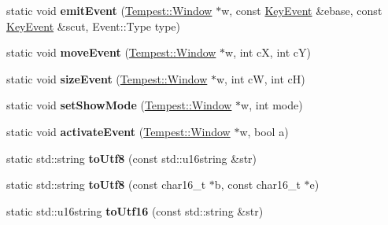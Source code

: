 \begin{DoxyCompactItemize}
\item 
\hypertarget{class_tempest_1_1_system_a_p_i_ae9f04d99e5fc7b2a70711ad51328b2d9}{static void {\bfseries emit\+Event} (\hyperlink{class_tempest_1_1_window}{Tempest\+::\+Window} $\ast$w, const \hyperlink{class_tempest_1_1_key_event}{Key\+Event} \&ebase, const \hyperlink{class_tempest_1_1_key_event}{Key\+Event} \&scut, Event\+::\+Type type)}\label{class_tempest_1_1_system_a_p_i_ae9f04d99e5fc7b2a70711ad51328b2d9}

\item 
\hypertarget{class_tempest_1_1_system_a_p_i_a32ef06cec2b7127355e8578afb216811}{static void {\bfseries move\+Event} (\hyperlink{class_tempest_1_1_window}{Tempest\+::\+Window} $\ast$w, int c\+X, int c\+Y)}\label{class_tempest_1_1_system_a_p_i_a32ef06cec2b7127355e8578afb216811}

\item 
\hypertarget{class_tempest_1_1_system_a_p_i_a6249f4902ba1c2e9e44467cd71828cca}{static void {\bfseries size\+Event} (\hyperlink{class_tempest_1_1_window}{Tempest\+::\+Window} $\ast$w, int c\+W, int c\+H)}\label{class_tempest_1_1_system_a_p_i_a6249f4902ba1c2e9e44467cd71828cca}

\item 
\hypertarget{class_tempest_1_1_system_a_p_i_a19c39989dc32f909744cf7680f6039bb}{static void {\bfseries set\+Show\+Mode} (\hyperlink{class_tempest_1_1_window}{Tempest\+::\+Window} $\ast$w, int mode)}\label{class_tempest_1_1_system_a_p_i_a19c39989dc32f909744cf7680f6039bb}

\item 
\hypertarget{class_tempest_1_1_system_a_p_i_aafd0082fd80b65af05a7f36b86195d4d}{static void {\bfseries activate\+Event} (\hyperlink{class_tempest_1_1_window}{Tempest\+::\+Window} $\ast$w, bool a)}\label{class_tempest_1_1_system_a_p_i_aafd0082fd80b65af05a7f36b86195d4d}

\item 
\hypertarget{class_tempest_1_1_system_a_p_i_adc53ce48990ec48d71d3d25728b852d6}{static std\+::string {\bfseries to\+Utf8} (const std\+::u16string \&str)}\label{class_tempest_1_1_system_a_p_i_adc53ce48990ec48d71d3d25728b852d6}

\item 
\hypertarget{class_tempest_1_1_system_a_p_i_a15ae70137459fa5211197e4d615e6ce6}{static std\+::string {\bfseries to\+Utf8} (const char16\+\_\+t $\ast$b, const char16\+\_\+t $\ast$e)}\label{class_tempest_1_1_system_a_p_i_a15ae70137459fa5211197e4d615e6ce6}

\item 
\hypertarget{class_tempest_1_1_system_a_p_i_a2e4587e3ad9a68f8d5f0f416ad11dc84}{static std\+::u16string {\bfseries to\+Utf16} (const std\+::string \&str)}\label{class_tempest_1_1_system_a_p_i_a2e4587e3ad9a68f8d5f0f416ad11dc84}


\end{DoxyCompactItemize}

